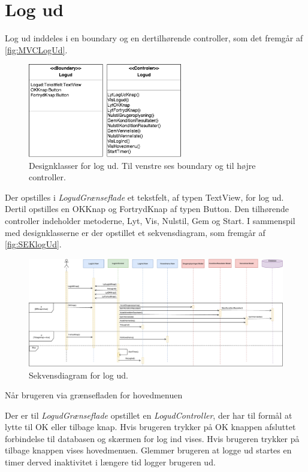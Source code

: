 \section*{Log ud}
Log ud inddeles i en boundary og en dertilhørende controller, som det fremgår af \autoref{fig:MVCLogUd}. 

\begin{figure} [H]
\centering
\includegraphics[width=0.6\textwidth]{figures/MVC/Logud}
\caption{Designklasser for log ud. Til venstre ses boundary og til højre controller.}
\label{fig:MVCLogUd}
\end{figure}

\noindent
Der opstilles i \textit{LogudGrænseflade} et tekstfelt, af typen TextView, for log ud. Dertil opstilles en OKKnap og FortrydKnap af typen Button. 
Den tilhørende controller indeholder metoderne, Lyt, Vis, Nulstil, Gem og Start. I sammenspil med designklasserne er der opstillet et sekvensdiagram, som fremgår af \autoref{fig:SEKlogUd}.

\begin{figure} [H]
\centering
\includegraphics[width=1.1\textwidth]{figures/Sek/SEKLogUd}
\caption{Sekvensdiagram for log ud.}
\label{fig:SEKlogUd}
\end{figure}

\noindent
Når brugeren via grænsefladen for hovedmenuen


Der er til \textit{LogudGrænseflade} opstillet en \textit{LogudController}, der har til formål at lytte til OK eller tilbage knap. Hvis brugeren trykker på OK knappen afsluttet forbindelse til databasen og skærmen for log ind vises. Hvis brugeren trykker på tilbage knappen vises hovedmenuen. Glemmer brugeren at logge ud startes en timer derved inaktivitet i længere tid logger brugeren ud. 
